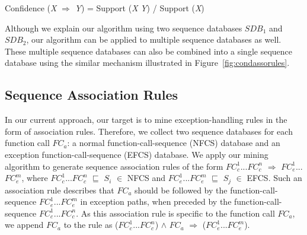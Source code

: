 \begin{CodeOut}
Confidence (\emph{X} $\Rightarrow$ \emph{Y}) = Support (\emph{X} \emph{Y}) / Support (\emph{X})
\end{CodeOut}

Although we explain our algorithm using two sequence databases $SDB_1$
and $SDB_2$, our algorithm can be applied to multiple sequence databases as well.
These multiple sequence databases can also be combined into 
a single sequence database using the similar mechanism illustrated in Figure~\ref{fig:condassorules}.

\vspace*{-2ex}
\subsection*{Sequence Association Rules}
\vspace*{-2ex}
In our current approach, our target is to mine exception-handling rules in the form 
of association rules. Therefore, we collect two sequence databases for each function call $FC_a$:
a normal function-call-sequence (NFCS) database and an exception function-call-sequence (EFCS) database.
We apply our mining algorithm to generate sequence association rules 
of the form $FC_c^1$...$FC_c^n$ $\Rightarrow$ $FC_e^1$...$FC_e^m$, where
$FC_c^1$...$FC_c^n$ $\sqsubseteq$ $S_i$ $\in$ NFCS and $FC_e^1$...$FC_e^m$ $\sqsubseteq$
$S_j$ $\in$ EFCS.
Such an association rule describes that $FC_a$ should be followed by the 
function-call-sequence $FC_e^1$...$FC_e^m$ in exception paths, when preceded 
by the function-call-sequence $FC_c^1$...$FC_c^n$. 
As this association rule is specific to the function call
$FC_a$, we append $FC_a$ to the rule as
($FC_c^1$...$FC_c^n$) $\wedge$ $FC_a$ $\Rightarrow$ ($FC_e^1$...$FC_e^m$).
